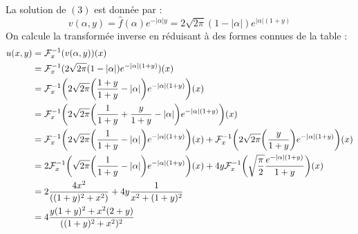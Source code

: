 La solution de $(3)$ est donnée par :
$$v(\alpha,y) = \widehat{f}(\alpha)e^{-|\alpha|y} = 2\sqrt{2\pi}(1-|\alpha|) e^{|\alpha|(1+y)}$$
On calcule la transformée inverse en réduisant à des formes connues de la table :
\begin{align*}
    u(x,y) &= \mathcal{F}_x^{-1}(v(\alpha,y))(x) \\
    &= \mathcal{F}_x^{-1}(2\sqrt{2\pi}(1-|\alpha|) e^{-|\alpha|(1+y)})(x) \\
    &= \mathcal{F}_x^{-1} \bigg{(} 2\sqrt{2\pi} \bigg{(} \frac{1+y}{1+y} - |\alpha| \bigg{)} e^{-|\alpha|(1+y)} \bigg{)}(x) \\
    &= \mathcal{F}_x^{-1} \bigg{(} 2\sqrt{2\pi} \bigg{(} \frac{1}{1+y} + \frac{y}{1+y} - |\alpha| \bigg{)} e^{-|\alpha|(1+y)} \bigg{)}(x) \\
    &= \mathcal{F}_x^{-1} \bigg{(} 2\sqrt{2\pi} \bigg{(} \frac{1}{1+y} - |\alpha| \bigg{)} e^{-|\alpha|(1+y)} \bigg{)}(x) + \mathcal{F}_x^{-1} \bigg{(} 2\sqrt{2\pi} \bigg{(} \frac{y}{1+y}\bigg{)} e^{-|\alpha|(1+y)} \bigg{)}(x) \\
    &= 2\mathcal{F}_x^{-1} \bigg{(} \sqrt{2\pi} \bigg{(} \frac{1}{1+y} - |\alpha| \bigg{)} e^{-|\alpha|(1+y)} \bigg{)}(x) + 4y \mathcal{F}_x^{-1} \bigg{(} \sqrt{\frac{\pi}{2}} \frac{e^{-|\alpha|(1+y)}}{1+y} \bigg{)}(x) \\
    &= 2 \frac{4x^2}{((1+y)^2+x^2)} + 4y \frac{1}{x^2+(1+y)^2} \\
    &= 4 \frac{y(1+y)^2+x^2(2+y)}{((1+y)^2+x^2)^2}
\end{align*}


